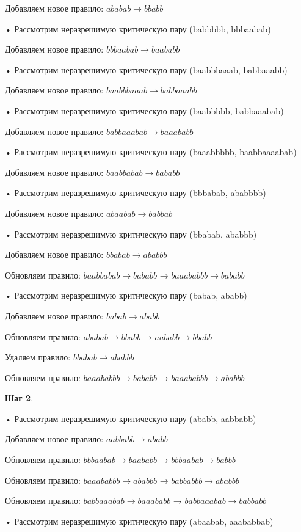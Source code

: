 \documentclass[a4paper, 14pt]{extarticle}
\begin{document}
        Добавляем новое правило: $ababab \to bbabb$

   • Рассмотрим неразрешимую критическую пару (babbbbb, bbbaabab)

        Добавляем новое правило: $bbbaabab \to baababb$

   • Рассмотрим неразрешимую критическую пару (baabbbaaab, babbaaabb)

        Добавляем новое правило: $baabbbaaab \to babbaaabb$

   • Рассмотрим неразрешимую критическую пару (baabbbbb, babbaaabab)

        Добавляем новое правило: $babbaaabab \to baaababb$

   • Рассмотрим неразрешимую критическую пару (baaabbbbb, baabbaaaabab)

        Добавляем новое правило: $baabbabab \to bababb$

   • Рассмотрим неразрешимую критическую пару (bbbabab, ababbbb)

        Добавляем новое правило: $abaabab \to babbab$

   • Рассмотрим неразрешимую критическую пару (bbabab, ababbb)

        Добавляем новое правило: $bbabab \to ababbb$

    Обновляем правило: $baabbabab \to bababb$ → $baaababbb \to bababb$

   • Рассмотрим неразрешимую критическую пару (babab, ababb)

        Добавляем новое правило: $babab \to ababb$

    Обновляем правило: $ababab \to bbabb$ → $aababb \to bbabb$

    Удаляем правило: $bbabab \to ababbb$

    Обновляем правило: $baaababbb \to bababb$ → $baaababbb \to ababbb$


 \textbf{Шаг 2}.

   • Рассмотрим неразрешимую критическую пару (ababb, aabbabb)

        Добавляем новое правило: $aabbabb \to ababb$

    Обновляем правило: $bbbaabab \to baababb$ → $bbbaabab \to babbb$

    Обновляем правило: $baaababbb \to ababbb$ → $babbabbb \to ababbb$

    Обновляем правило: $babbaaabab \to baaababb$ → $babbaaabab \to babbabb$

   • Рассмотрим неразрешимую критическую пару (abaabab, aaababbab)
\end{document}

